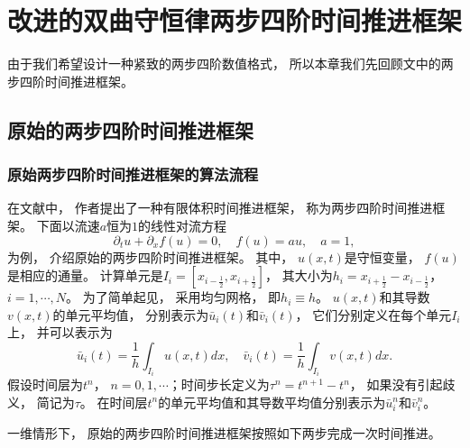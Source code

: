 \chapter{改进的双曲守恒律两步四阶时间推进框架}
\label{sec:framework}

由于我们希望设计一种紧致的两步四阶数值格式，
所以本章我们先回顾文\cite{li2016two}中的两步四阶时间推进框架。

\section{原始的两步四阶时间推进框架}

\subsection{原始两步四阶时间推进框架的算法流程}

在文献\cite{li2016two}中，
作者提出了一种有限体积时间推进框架，
称为两步四阶时间推进框架。
下面以流速$a$恒为$1$的线性对流方程
\begin{equation}
  \label{eq:Sec2-1D-linear}
  {\partial_{t}} u + {\partial_{x}} f(u) = 0, \quad f(u) = au, \quad a=1,
\end{equation}
为例，
介绍原始的两步四阶时间推进框架。
其中，
$u(x,t)$是守恒变量，
$f(u)$是相应的通量。
计算单元是$I_{i}=[x_{i-\frac 12},x_{i+\frac 12}]$，
其大小为$h_i=x_{i+\frac 12}-x_{i-\frac 12}$，
$i=1,\cdots, N$。
为了简单起见，
采用均匀网格，
即$h_i\equiv h$。
$u(x,t)$和其导数$v(x,t)$的单元平均值，
分别表示为$\bar{u}_{i}(t)$和$\bar{v}_{i}(t)$，
它们分别定义在每个单元$I_{i}$上，
并可以表示为
\begin{equation}
  \label{eq:1D-linear-average}
  \bar{u}_{i}(t)=\frac{1}{h}\int_{I_{i}} u(x,t) dx, \quad
  \bar{v}_{i}(t)=\frac{1}{h}\int_{I_{i}} v(x,t) dx.
\end{equation}
假设时间层为$t^n$，
$n=0,1,\cdots$；时间步长定义为$\tau^n = t^{n+1} - t^{n}$，
如果没有引起歧义，
简记为$\tau$。
在时间层$t^n$的单元平均值和其导数平均值分别表示为$\bar{u}_{i}^n$和$\bar{v}_{i}^n$。

一维情形下，
原始的两步四阶时间推进框架按照如下两步完成一次时间推进。

